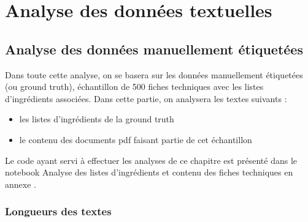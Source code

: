 \part{Analyse des données textuelles}

    \chapter{Analyse des données manuellement étiquetées}

        Dans toute cette analyse, on se basera sur les données manuellement étiquetées (ou ground truth), échantillon de 500 fiches techniques avec les listes d'ingrédients associées.
        Dans cette partie, on analysera les textes suivants : 
        \begin{itemize}
            \item les listes d'ingrédients de la ground truth
            \item le contenu des documents pdf faisant partie de cet échantillon
        \end{itemize}
        Le code ayant servi à effectuer les analyses de ce chapitre est présenté dans le notebook \og Analyse des listes d’ingrédients et contenu des fiches techniques \fg en annexe .

        \section{Longueurs des textes}

